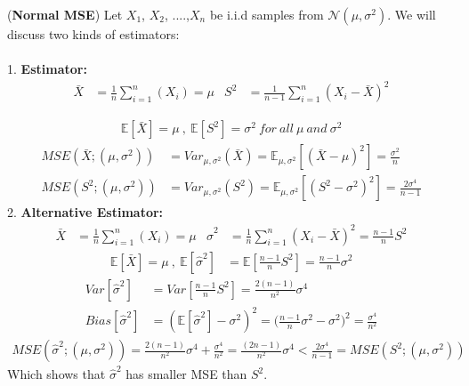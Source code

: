 \documentclass[12pt]{report}
\begin{document}
\begin{exmp}(\textbf{Normal MSE})
Let $X_1$, $X_2$, ....,$X_n$ be i.i.d samples from $\mathcal{N}(\mu , \sigma ^2)$. We will discuss two kinds of estimators:
\\
\\ 1. \textbf{ Estimator:}
 \begin{align*}
      \bar{X} &= \frac{1}{n} \sum_{i=1}^{n}(X_i) = \mu &
      S^2 &= \frac{1}{n-1} \sum_{i=1}^{n}(X_i - \bar{X})^2
 \end{align*}
 
\begin{align*}
\mathbb{E}[\bar{X}] = \mu \ , \ \mathbb{E}[S^2] = \sigma ^2 \ for \ all \ \mu \ and \  \sigma ^2
\end{align*}
\begin{align*}
MSE(\bar{X} ; (\mu , \sigma ^2)) &= Var_{\mu , \sigma ^2}(\bar{X}) = \mathbb{E}_{\mu , \sigma ^ 2}[(\bar{X} - \mu)^2] = \frac{\sigma ^2}{n}\\
MSE(S^2 ; (\mu , \sigma ^2)) &= Var_{\mu , \sigma ^2}(S^2) = \mathbb{E}_{\mu , \sigma ^ 2}[(S^2 - \sigma ^2)^2] = \frac{2 \sigma ^4}{n - 1}
\end{align*}
2. \textbf{Alternative Estimator:}
\begin{align*}
\bar{X} &= \frac{1}{n} \sum_{i=1}^{n}(X_i) = \mu &
\hat{\sigma}^2 &= \frac{1}{n} \sum_{i=1}^{n}(X_i - \bar{X})^2 = \frac{n-1}{n} S^2
\end{align*}
\begin{align*}
\mathbb{E}[\bar{X}] = \mu \ , \ \mathbb{E}[\hat{\sigma}^2] &= \mathbb{E}[\frac{n-1}{n} S^2] = \frac{n-1}{n} \sigma ^2
\end{align*}
\begin{align*}
Var[\hat{\sigma}^2] &= Var[\frac{n-1}{n} S^2] = \frac{2(n-1)}{n^2} \sigma ^4\\
Bias[\hat{\sigma}^2] &= (\mathbb{E}[\hat{\sigma}^2] - \sigma ^2)^2 =     \Big( \frac{n-1}{n} \sigma ^2 - \sigma ^2 \Big)^2 = \frac{\sigma ^4}{n^2}
\end{align*}
\begin{align*}
MSE(\hat{\sigma}^2 ; (\mu , \sigma ^2)) = \frac{2(n-1)}{n^2} \sigma ^4 + \frac{\sigma ^4}{n^2} = \frac{(2n-1)}{n^2} \sigma ^4 < \frac{2 \sigma ^4}{n-1} = MSE(S^2 ; (\mu , \sigma ^2))
\end{align*}
Which shows that $\hat{\sigma}^2$ has smaller MSE than $S^2$.

\end{exmp}

\vspace{2cm}
\end{document}
